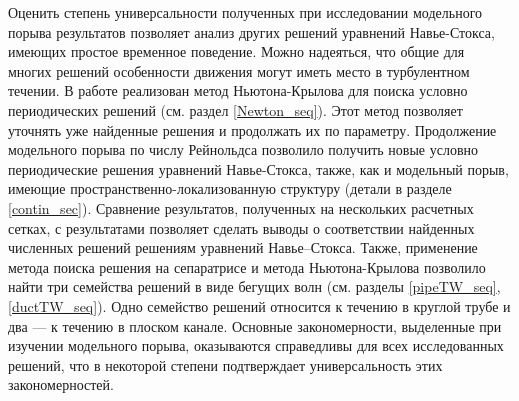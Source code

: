 Оценить степень универсальности полученных при исследовании модельного порыва результатов позволяет анализ других решений уравнений Навье-Стокса, имеющих простое временное поведение. Можно надеяться, что общие для многих решений особенности движения могут иметь место в турбулентном течении. В работе реализован метод Ньютона-Крылова \cite{Viswanath2007, Dijkstra2014} для поиска условно периодических решений (см. раздел  \ref{Newton_seq}). Этот метод позволяет уточнять уже найденные решения и продолжать их по параметру. Продолжение модельного порыва по числу Рейнольдса позволило получить новые условно периодические решения уравнений Навье-Стокса, также, как и модельный порыв, имеющие пространственно-локализованную структуру (детали в разделе \ref{contin_sec}). Сравнение результатов, полученных на нескольких расчетных сетках, с результатами \cite{Avila2013} позволяет сделать выводы о соответствии найденных численных решений решениям уравнений Навье--Стокса. Также, применение метода поиска решения на сепаратрисе и метода Ньютона-Крылова позволило найти три семейства решений в виде бегущих волн (см. разделы \ref{pipeTW_seq}, \ref{ductTW_seq}). Одно семейство решений относится к течению в круглой трубе и два --- к течению в плоском канале. Основные закономерности, выделенные при изучении модельного порыва, оказываются справедливы для всех исследованных решений, что в некоторой степени подтверждает универсальность этих закономерностей. 

